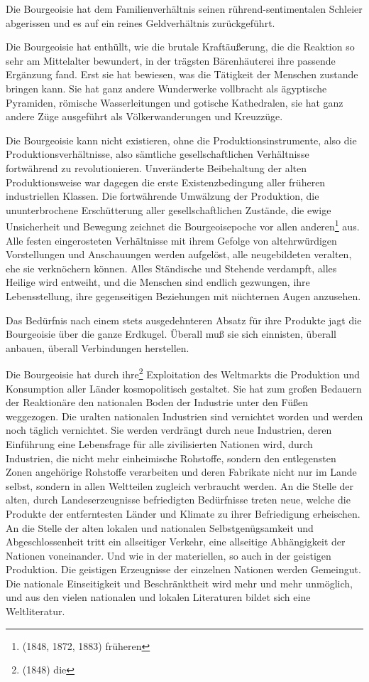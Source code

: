 \documentclass[letterpaper]{article}
\begin{document}
Die Bourgeoisie hat dem Familienverhältnis seinen rührend-sentimentalen Schleier abgerissen und es auf ein reines Geldverhältnis zurückgeführt.

Die Bourgeoisie hat enthüllt, wie die brutale Kraftäußerung, die die Reaktion so sehr am Mittelalter bewundert, in der trägsten Bärenhäuterei ihre passende Ergänzung fand. Erst sie hat bewiesen, was die Tätigkeit der Menschen zustande bringen kann. Sie hat ganz andere Wunderwerke vollbracht als ägyptische Pyramiden, römische Wasserleitungen und gotische Kathedralen, sie hat ganz andere Züge ausgeführt als Völkerwanderungen und Kreuzzüge.

Die Bourgeoisie kann nicht existieren, ohne die Produktionsinstrumente, also die Produktionsverhältnisse, also sämtliche gesellschaftlichen Verhältnisse fortwährend zu revolutionieren. Unveränderte Beibehaltung der alten Produktionsweise war dagegen die erste Existenzbedingung aller früheren industriellen Klassen. Die fortwährende Umwälzung der Produktion, die ununterbrochene Erschütterung aller gesellschaftlichen Zustände, die ewige Unsicherheit und Bewegung zeichnet die Bourgeoisepoche vor allen anderen\footnote{(1848, 1872, 1883) früheren} aus. Alle festen eingerosteten Verhältnisse mit ihrem Gefolge von altehrwürdigen Vorstellungen und Anschauungen werden aufgelöst, alle neugebildeten veralten, ehe sie verknöchern können. Alles Ständische und Stehende verdampft, alles Heilige wird entweiht, und die Menschen sind endlich gezwungen, ihre Lebensstellung, ihre gegenseitigen Beziehungen mit nüchternen Augen anzusehen.

Das Bedürfnis nach einem stets ausgedehnteren Absatz für ihre Produkte jagt die Bourgeoisie über die ganze Erdkugel. Überall muß sie sich einnisten, überall anbauen, überall Verbindungen herstellen.

Die Bourgeoisie hat durch ihre\footnote{(1848) die} Exploitation des Weltmarkts die Produktion und Konsumption aller Länder kosmopolitisch gestaltet. Sie hat zum großen Bedauern der Reaktionäre den nationalen Boden der Industrie unter den Füßen weggezogen. Die uralten nationalen Industrien sind vernichtet worden und werden noch täglich vernichtet. Sie werden verdrängt durch neue Industrien, deren Einführung eine Lebensfrage für alle zivilisierten Nationen wird, durch Industrien, die nicht mehr einheimische Rohstoffe, sondern den entlegensten Zonen angehörige Rohstoffe verarbeiten und deren Fabrikate nicht nur im Lande selbst, sondern in allen Weltteilen zugleich verbraucht werden. An die Stelle der alten, durch Landeserzeugnisse befriedigten Bedürfnisse treten neue, welche die Produkte der entferntesten Länder und Klimate zu ihrer Befriedigung erheischen. An die Stelle der alten lokalen und nationalen Selbstgenügsamkeit und Abgeschlossenheit tritt ein allseitiger Verkehr, eine allseitige Abhängigkeit der Nationen voneinander. Und wie in der materiellen, so auch in der geistigen Produktion. Die geistigen Erzeugnisse der einzelnen Nationen werden Gemeingut. Die nationale Einseitigkeit und Beschränktheit wird mehr und mehr unmöglich, und aus den vielen nationalen und lokalen Literaturen bildet sich eine Weltliteratur.
\end{document}
